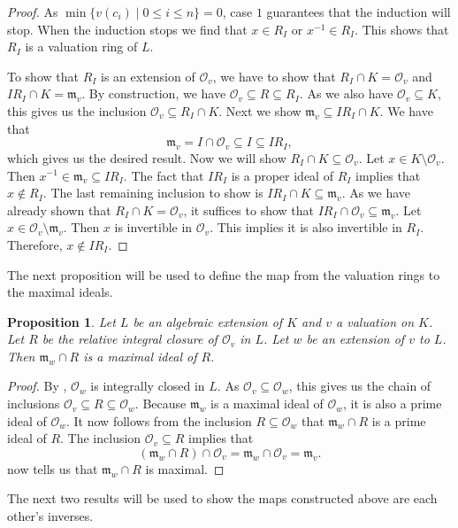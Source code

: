 \documentclass[12pt,a4paper]{amsart}
\newtheorem{prop}[thm]{Proposition}
\theoremstyle{definition}
\begin{document}
\begin{proof}
As $\min\{v(c_i)\mid0\leq i\leq n\}=0$, case $1$ guarantees that the induction will stop.
When the induction stops we find that $x\in R_I$ or $x^{-1}\in R_I$.
This shows that $R_I$ is a valuation ring of $L$.

To show that $R_I$ is an extension of $\mathcal{O}_v$, we have to show that $R_I\cap K=\mathcal{O}_v$ and $IR_I\cap K=\mathfrak{m}_v$.
By construction, we have $\mathcal{O}_v\subseteq R\subseteq R_I$.
As we also have $\mathcal{O}_v\subseteq K$, this gives us the inclusion $\mathcal{O}_v\subseteq R_I\cap K$.
Next we show $\mathfrak{m}_v\subseteq IR_I\cap K$.
We have that
$$\mathfrak{m}_v=I\cap \mathcal{O}_v\subseteq I\subseteq IR_I,$$
which gives us the desired result.
Now we will show $R_I\cap K\subseteq \mathcal{O}_v$.
Let $x\in K\setminus \mathcal{O}_v$. Then $x^{-1}\in\mathfrak{m}_v\subseteq IR_I$.
The fact that $IR_I$ is a proper ideal of $R_I$ implies that $x\notin R_I$.
The last remaining inclusion to show is $IR_I\cap K\subseteq\mathfrak{m}_v$.
As we have already shown that $R_I\cap K=\mathcal{O}_v$, it suffices to show that $IR_I\cap \mathcal{O}_v\subseteq\mathfrak{m}_v$.
Let $x\in \mathcal{O}_v\setminus\mathfrak{m}_v$.
Then $x$ is invertible in $\mathcal{O}_v$.
This implies it is also invertible in $R_I$.
Therefore, $x\notin IR_I$.
\end{proof}
The next proposition will be used to define the map from the valuation rings to the maximal ideals.
\begin{prop}{\label{max}}
Let $L$ be an algebraic extension of $K$ and $v$ a valuation on $K$.
Let $R$ be the relative integral closure of $\mathcal{O}_v$ in $L$.
Let $w$ be an extension of $v$ to $L$.
Then $\mathfrak{m}_w\cap R$ is a maximal ideal of $R$.
\end{prop}
\begin{proof}
By , $\mathcal{O}_w$ is integrally closed in $L$.
As $\mathcal{O}_v\subseteq \mathcal{O}_w$, this gives us the chain of inclusions $\mathcal{O}_v\subseteq R\subseteq \mathcal{O}_w$.
Because $\mathfrak{m}_w$ is a maximal ideal of $\mathcal{O}_w$, it is also a prime ideal of $\mathcal{O}_w$.
It now follows from the inclusion $R\subseteq \mathcal{O}_w$ that $\mathfrak{m}_w\cap R$ is a prime ideal of $R$.
The inclusion $\mathcal{O}_v\subseteq R$ implies that $$(\mathfrak{m}_w\cap R)\cap \mathcal{O}_v=\mathfrak{m}_w\cap \mathcal{O}_v=\mathfrak{m}_v.$$
 now tells us that $\mathfrak{m}_w\cap R$ is maximal.
\end{proof}
The next two results will be used to show the maps constructed above are each other's inverses.
\end{document}
